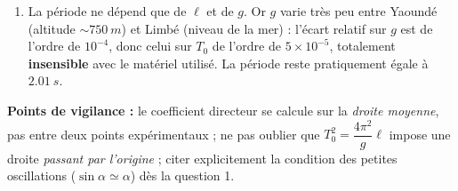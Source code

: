 \documentclass[11pt]{article}
\begin{document}
\begin{corrige}
\begin{enumerate}
\item La période ne dépend que de $\ell$ et de $g$. Or $g$ varie très peu entre Yaoundé (altitude $\sim\SI{750}{m}$) et Limbé (niveau de la mer) : l'écart relatif sur $g$ est de l'ordre de $10^{-4}$, donc celui sur $T_0$ de l'ordre de $5\times 10^{-5}$, totalement \textbf{insensible} avec le matériel utilisé. La période reste pratiquement égale à $\SI{2,01}{s}$.
\end{enumerate}
\textbf{Points de vigilance :} le coefficient directeur se calcule sur la \emph{droite moyenne}, pas entre deux points expérimentaux ; ne pas oublier que $T_0^2 = \dfrac{4\pi^2}{g}\ell$ impose une droite \emph{passant par l'origine} ; citer explicitement la condition des petites oscillations ($\sin\alpha \simeq \alpha$) dès la question 1.
\end{corrige}
\end{document}
